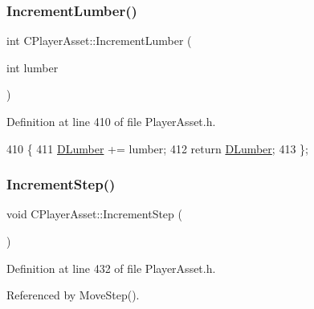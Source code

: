 \subsubsection{\texorpdfstring{Increment\+Lumber()}{IncrementLumber()}}
{\footnotesize\ttfamily int C\+Player\+Asset\+::\+Increment\+Lumber (\begin{DoxyParamCaption}\item[{int}]{lumber }\end{DoxyParamCaption})\hspace{0.3cm}{\ttfamily [inline]}}



Definition at line 410 of file Player\+Asset.\+h.


\begin{DoxyCode}
410                                        \{
411             \hyperlink{classCPlayerAsset_af726ea7df9596f02cdb1428d61186349}{DLumber} += lumber;
412             \textcolor{keywordflow}{return} \hyperlink{classCPlayerAsset_af726ea7df9596f02cdb1428d61186349}{DLumber};
413         \};
\end{DoxyCode}
\hypertarget{classCPlayerAsset_aa1d39b408fd5aa11f2c3a19ef4d3895d}{}\label{classCPlayerAsset_aa1d39b408fd5aa11f2c3a19ef4d3895d} 
\subsubsection{\texorpdfstring{Increment\+Step()}{IncrementStep()}}
{\footnotesize\ttfamily void C\+Player\+Asset\+::\+Increment\+Step (\begin{DoxyParamCaption}{ }\end{DoxyParamCaption})\hspace{0.3cm}{\ttfamily [inline]}}



Definition at line 432 of file Player\+Asset.\+h.



Referenced by Move\+Step().


